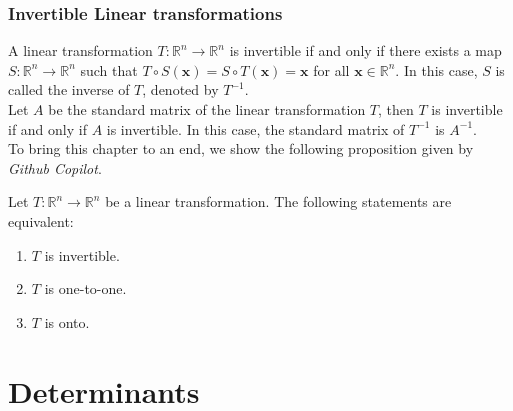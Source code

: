 \documentclass[10pt, a4paper]{article}
\begin{document}
\subsubsection*{Invertible Linear transformations}
A linear transformation $T: \mathbb{R}^n \rightarrow \mathbb{R}^n$ is invertible if and only if there exists a map $S: \mathbb{R}^n \rightarrow \mathbb{R}^n$ such that $T\circ S (\mathbf{x}) = S\circ T (\mathbf{x}) = \mathbf{x}$ for all $\mathbf{x} \in \mathbb{R}^n$. In this case, $S$ is called the inverse of $T$, denoted by $T^{-1}$.\\
\indent Let $A$ be the standard matrix of the linear transformation $T$, then $T$ is invertible if and only if $A$ is invertible. In this case, the standard matrix of $T^{-1}$ is $A^{-1}$.\\
\indent To bring this chapter to an end, we show the following proposition given by \textit{Github Copilot}.
\begin{proposition}
    Let $T: \mathbb{R}^n \rightarrow \mathbb{R}^n$ be a linear transformation. The following statements are equivalent:
    \begin{enumerate}
        \item $T$ is invertible.
        \item $T$ is one-to-one.
        \item $T$ is onto.
    \end{enumerate}
\end{proposition}



\newpage
\section{Determinants}
\end{document}
